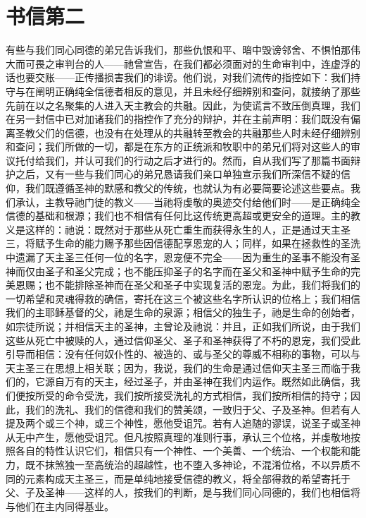 
\section{书信第二}

\par

\par

有些与我们同心同德的弟兄告诉我们，那些仇恨和平、暗中毁谤邻舍、不惧怕那伟大而可畏之审判台的人——祂曾宣告，在我们都必须面对的生命审判中，连虚浮的话也要交账——正传播损害我们的诽谤。他们说，对我们流传的指控如下：我们持守与在阐明正确纯全信德者相反的意见，并且未经仔细辨别和查问，就接纳了那些先前在以之名聚集的人进入天主教会的共融。因此，为使谎言不致压倒真理，我们在另一封信中已对加诸我们的指控作了充分的辩护，并在主前声明：我们既没有偏离圣教父们的信德，也没有在处理从的共融转至教会的共融那些人时未经仔细辨别和查问；我们所做的一切，都是在东方的正统派和牧职中的弟兄们将对这些人的审议托付给我们，并认可我们的行动之后才进行的。然而，自从我们写了那篇书面辩护之后，又有一些与我们同心的弟兄恳请我们亲口单独宣示我们所深信不疑的信仰，我们既遵循圣神的默感和教父的传统，也就认为有必要简要论述这些要点。我们承认，主教导祂门徒的教义——当祂将虔敬的奥迹交付给他们时——是正确纯全信德的基础和根源；我们也不相信有任何比这传统更高超或更安全的道理。主的教义是这样的：祂说：既然对于那些从死亡重生而获得永生的人，正是通过天主圣三，将赋予生命的能力赐予那些因信德配享恩宠的人；同样，如果在拯救性的圣洗中遗漏了天主圣三任何一位的名字，恩宠便不完全——因为重生的圣事不能没有圣神而仅由圣子和圣父完成；也不能压抑圣子的名字而在圣父和圣神中赋予生命的完美恩赐；也不能排除圣神而在圣父和圣子中实现复活的恩宠。为此，我们将我们的一切希望和灵魂得救的确信，寄托在这三个被这些名字所认识的位格上；我们相信我们的主耶稣基督的父，祂是生命的泉源；相信父的独生子，祂是生命的创始者，如宗徒所说；并相信天主的圣神，主曾论及祂说：并且，正如我们所说，由于我们这些从死亡中被赎的人，通过信仰圣父、圣子和圣神获得了不朽的恩宠，我们受此引导而相信：没有任何奴仆性的、被造的、或与圣父的尊威不相称的事物，可以与天主圣三在思想上相关联；因为，我说，我们的生命是通过信仰天主圣三而临于我们的，它源自万有的天主，经过圣子，并由圣神在我们内运作。既然如此确信，我们便按所受的命令受洗，我们按所接受洗礼的方式相信，我们按所相信的持守；因此，我们的洗礼、我们的信德和我们的赞美颂，一致归于父、子及圣神。但若有人提及两个或三个神，或三个神性，愿他受诅咒。若有人追随的谬误，说圣子或圣神从无中产生，愿他受诅咒。但凡按照真理的准则行事，承认三个位格，并虔敬地按照各自的特性认识它们，相信只有一个神性、一个美善、一个统治、一个权能和能力，既不抹煞独一至高统治的超越性，也不堕入多神论，不混淆位格，不以异质不同的元素构成天主圣三，而是单纯地接受信德的教义，将全部得救的希望寄托于父、子及圣神——这样的人，按我们的判断，是与我们同心同德的，我们也相信将与他们在主内同得基业。\par

